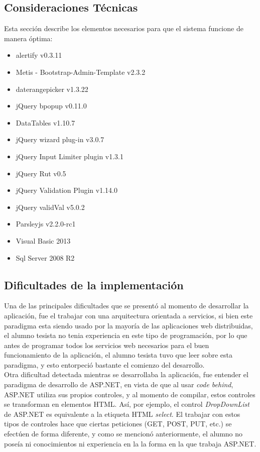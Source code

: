\subsection{Consideraciones Técnicas}

Esta sección describe los elementos necesarios para que el sistema funcione de manera óptima:

\begin{itemize}
	\item alertify v0.3.11
	\item Metis - Bootstrap-Admin-Template v2.3.2
	\item daterangepicker v1.3.22
	\item jQuery  bpopup v0.11.0
	\item DataTables v1.10.7
	\item jQuery wizard plug-in v3.0.7
	\item jQuery Input Limiter plugin v1.3.1
	\item jQuery Rut v0.5
	\item jQuery Validation Plugin v1.14.0
	\item jQuery validVal v5.0.2
	\item Parsleyjs v2.2.0-rc1
	\item Visual Basic 2013
	\item Sql Server 2008 R2\end{itemize}


\subsection{Dificultades de la implementación} \label{Dificultades}



Una de las principales dificultades que se presentó al momento de desarrollar la aplicación, fue el trabajar con una arquitectura orientada a servicios, si bien este paradigma esta siendo usado por la mayoría de las aplicaciones web distribuidas, el alumno  tesista no tenia experiencia en este tipo de programación, por lo que antes de programar todos los servicios web necesarios para el buen funcionamiento de la aplicación, el alumno tesista tuvo que leer sobre esta paradigma, y esto entorpeció bastante el comienzo del desarrollo.\\

Otra dificultad detectada mientras se desarrollaba la aplicación, fue entender el paradigma de desarrollo de ASP.NET, en vista de que al usar \textit{code behind}, ASP.NET utiliza sus propios controles, y  al momento de compilar, estos controles se transforman en elementos HTML. Así, por ejemplo, el control \textit{DropDownList} de ASP.NET es equivalente a la etiqueta HTML \textit{select}. El trabajar con estos tipos de  controles hace que ciertas peticiones (GET, POST, PUT, etc.) se efectúen de forma diferente, y como se mencionó anteriormente, el alumno no poseía ni conocimientos ni experiencia en la la forma en la que trabaja ASP.NET.
\\

